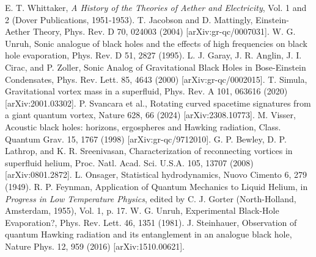 \documentclass{article}
\begin{document}
\begin{thebibliography}{}
 E. T. Whittaker, \emph{A History of the Theories of Aether and Electricity}, Vol. 1 and 2 (Dover Publications, 1951-1953).
 T. Jacobson and D. Mattingly, Einstein-Aether Theory, Phys. Rev. D 70, 024003 (2004) [arXiv:gr-qc/0007031].
 W. G. Unruh, Sonic analogue of black holes and the effects of high frequencies on black hole evaporation, Phys. Rev. D 51, 2827 (1995).
 L. J. Garay, J. R. Anglin, J. I. Cirac, and P. Zoller, Sonic Analog of Gravitational Black Holes in Bose-Einstein Condensates, Phys. Rev. Lett. 85, 4643 (2000) [arXiv:gr-qc/0002015].
 T. Simula, Gravitational vortex mass in a superfluid, Phys. Rev. A 101, 063616 (2020) [arXiv:2001.03302].
 P. Svancara et al., Rotating curved spacetime signatures from a giant quantum vortex, Nature 628, 66 (2024) [arXiv:2308.10773].
 M. Visser, Acoustic black holes: horizons, ergospheres and Hawking radiation, Class. Quantum Grav. 15, 1767 (1998) [arXiv:gr-qc/9712010].
 G. P. Bewley, D. P. Lathrop, and K. R. Sreenivasan, Characterization of reconnecting vortices in superfluid helium, Proc. Natl. Acad. Sci. U.S.A. 105, 13707 (2008) [arXiv:0801.2872].
 L. Onsager, Statistical hydrodynamics, Nuovo Cimento 6, 279 (1949).
 R. P. Feynman, Application of Quantum Mechanics to Liquid Helium, in \emph{Progress in Low Temperature Physics}, edited by C. J. Gorter (North-Holland, Amsterdam, 1955), Vol. 1, p. 17.
 W. G. Unruh, Experimental Black-Hole Evaporation?, Phys. Rev. Lett. 46, 1351 (1981).
 J. Steinhauer, Observation of quantum Hawking radiation and its entanglement in an analogue black hole, Nature Phys. 12, 959 (2016) [arXiv:1510.00621].
\end{thebibliography}
\end{document}
